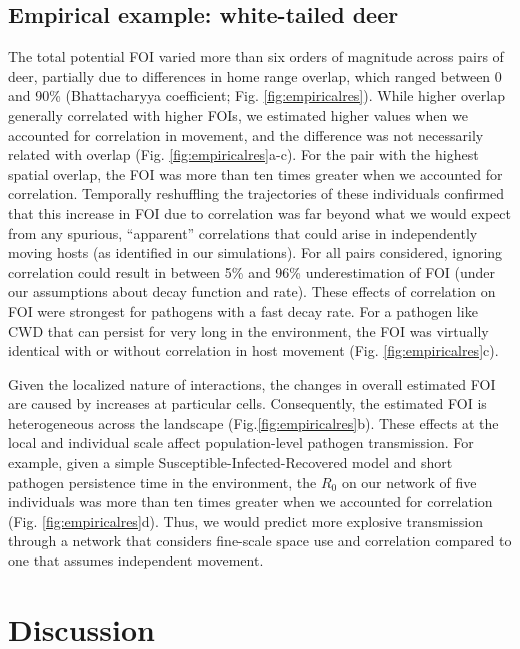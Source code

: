 \documentclass[letterpaper]{article}
\begin{document}
\subsection*{Empirical example: white-tailed deer}

The total potential FOI varied more than six orders of magnitude across pairs of deer, partially due to differences in home range overlap, which ranged between 0 and 90\% (Bhattacharyya coefficient; Fig. \ref{fig:empiricalres}). While higher overlap generally correlated with higher FOIs, we estimated higher values when we accounted for correlation in movement, and the difference was not necessarily related with overlap (Fig. \ref{fig:empiricalres}a-c).  For the pair with the highest spatial overlap, the FOI was more than ten times greater when we accounted for correlation. Temporally reshuffling the trajectories of these individuals  \citet[following ][]{Spiegel2016} confirmed that this increase in FOI due to correlation was far beyond what we would expect from any  spurious, ``apparent'' correlations that could arise in independently moving hosts (as identified in our simulations). For all pairs considered, ignoring correlation could result in between 5\% and 96\% underestimation of FOI (under our assumptions about decay function and rate). These effects of correlation on FOI were strongest for pathogens with a fast decay rate. For a pathogen like CWD that can persist for very long in the environment, the FOI was virtually identical with or without correlation in host movement (Fig. \ref{fig:empiricalres}c). 

Given the localized nature of interactions, the changes in overall estimated FOI are caused by increases at particular cells. Consequently, the estimated FOI is heterogeneous across the landscape (Fig.\ref{fig:empiricalres}b). These effects at the local and individual scale affect population-level pathogen transmission. For example, given a simple Susceptible-Infected-Recovered model and short pathogen persistence time in the environment, the $R_0$ on our network of five individuals was more than ten times greater when we accounted for correlation (Fig. \ref{fig:empiricalres}d). Thus, we would predict more explosive transmission through a network that considers fine-scale space use and correlation compared to one that assumes independent movement.

\section*{Discussion}
\end{document}
